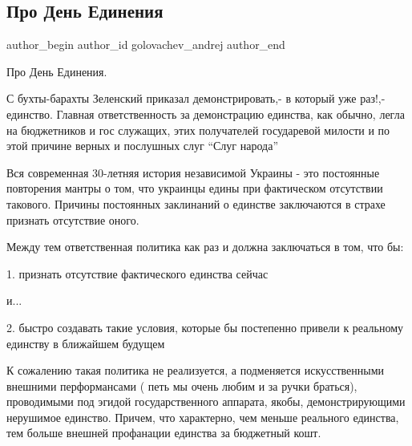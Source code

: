  
 
 
 
 
 
\subsection{Про День Единения}
\label{sec:16_02_2022.fb.golovachev_andrej.2.pro_den_jedinenia}
 
\ifcmt
 author_begin
   author_id golovachev_andrej
 author_end
\fi

Про День Единения.

С бухты-барахты  Зеленский приказал демонстрировать,- в который уже раз!,-
единство.  Главная ответственность за демонстрацию единства, как  обычно, легла
на бюджетников  и гос служащих, этих   получателей государевой милости и по
этой причине  верных  и  послушных слуг \enquote{Слуг народа} 

Вся современная 30-летняя  история  независимой Украины - это постоянные
повторения мантры  о том, что украинцы едины при фактическом отсутствии
такового. Причины постоянных заклинаний о единстве заключаются  в страхе
признать отсутствие оного.

Между тем ответственная политика  как раз и должна заключаться в том, что бы:

1. признать отсутствие фактического единства сейчас

и...

2.  быстро создавать такие условия, которые бы постепенно привели к реальному
единству  в ближайшем будущем

К сожалению такая политика не реализуется, а подменяется искусственными
внешними  перформансами  ( петь  мы очень любим и за ручки браться),
проводимыми под эгидой государственного аппарата, якобы, демонстрирующими
нерушимое единство. Причем, что характерно, чем меньше реального единства, тем
больше внешней профанации единства  за  бюджетный кошт.
